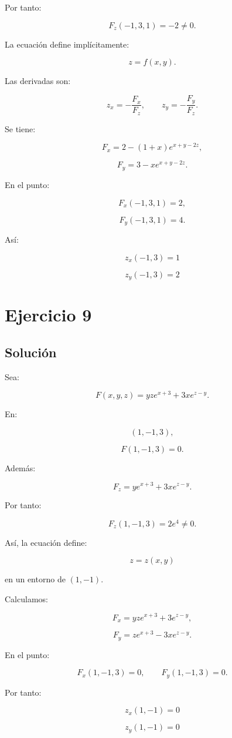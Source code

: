 \documentclass[11pt,a4paper]{article}
\begin{document}
Por tanto:

\[
F_z(-1,3,1)=-2\neq0.
\]

La ecuación define implícitamente:

\[
z=f(x,y).
\]

Las derivadas son:

\[
z_x
=
-\frac{F_x}{F_z},
\qquad
z_y
=
-\frac{F_y}{F_z}.
\]

Se tiene:

\[
F_x
=
2-(1+x)e^{x+y-2z},
\]

\[
F_y
=
3-xe^{x+y-2z}.
\]

En el punto:

\[
F_x(-1,3,1)=2,
\]

\[
F_y(-1,3,1)=4.
\]

Así:

\[
\boxed{
z_x(-1,3)=1
}
\]

\[
\boxed{
z_y(-1,3)=2
}
\]

\section{Ejercicio 9}
\subsection{Solución}

Sea:

\[
F(x,y,z)
=
yze^{x+3}
+
3xe^{z-y}.
\]

En:

\[
(1,-1,3),
\]

\[
F(1,-1,3)=0.
\]

Además:

\[
F_z
=
ye^{x+3}
+
3xe^{z-y}.
\]

Por tanto:

\[
F_z(1,-1,3)
=
2e^4\neq0.
\]

Así, la ecuación define:

\[
z=z(x,y)
\]

en un entorno de \((1,-1)\).

Calculamos:

\[
F_x
=
yze^{x+3}
+
3e^{z-y},
\]

\[
F_y
=
ze^{x+3}
-
3xe^{z-y}.
\]

En el punto:

\[
F_x(1,-1,3)=0,
\qquad
F_y(1,-1,3)=0.
\]

Por tanto:

\[
\boxed{
z_x(1,-1)=0
}
\]

\[
\boxed{
z_y(1,-1)=0
}
\]
\end{document}
